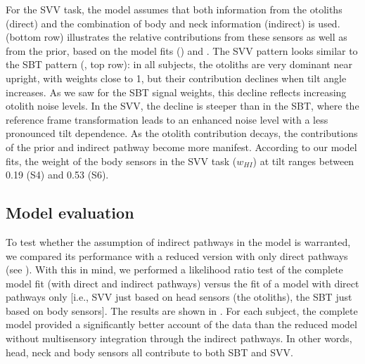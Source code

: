 For the SVV task, the model assumes that both information from the otoliths (direct) and the combination of body and neck information (indirect) is used.  (bottom row) illustrates the relative contributions from these sensors as well as from the prior, based on the model fits () and . The SVV pattern looks similar to the SBT pattern (, top row): in all subjects, the otoliths are very dominant near upright, with weights close to 1, but their contribution declines when tilt angle increases. As we saw for the SBT signal weights, this decline reflects increasing otolith noise levels. In the SVV, the decline is steeper than in the SBT, where the reference frame transformation leads to an enhanced noise level with a less pronounced tilt dependence. As the otolith contribution decays, the contributions of the prior and indirect pathway become more manifest. According to our model fits, the weight of the body sensors in the SVV task ($w_{HI}$) at  tilt ranges between 0.19 (S4) and 0.53 (S6). 

\subsection{Model evaluation}
 
To test whether the assumption of indirect pathways in the model is warranted, we compared its performance with a reduced version with only direct pathways (see ). With this in mind, we performed a likelihood ratio test of the complete model fit (with direct and indirect pathways) versus the fit of a model with direct pathways only [i.e., SVV just based on head sensors (the otoliths), the SBT just based on body sensors]. The results are shown in . For each subject, the complete model provided a significantly better account of the data than the reduced model without multisensory integration through the indirect pathways. In other words, head, neck and body sensors all contribute to both SBT and SVV. 

